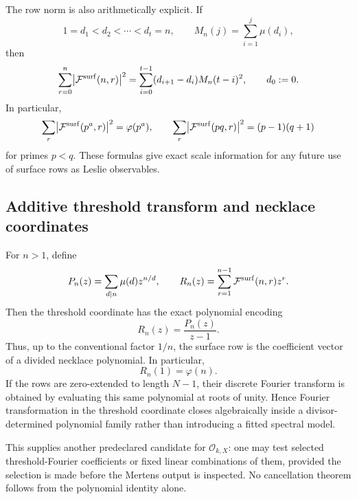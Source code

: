 \documentclass[11pt]{amsart}
\numberwithin{equation}{section}
\theoremstyle{plain}
\theoremstyle{definition}
\theoremstyle{remark}
\begin{document}
The row norm is also arithmetically explicit.  If
\[
1=d_1<d_2<\cdots<d_t=n,
\qquad
M_n(j)=\sum_{i=1}^j\mu(d_i),
\]
then
\begin{equation}
\sum_{r=0}^{n}\bigl|\mathcal F^{\rm surf}(n,r)\bigr|^2
=
\sum_{i=0}^{t-1}(d_{i+1}-d_i)M_n(t-i)^2,
\qquad d_0:=0.
\label{eq:v9_surface_row_energy}
\end{equation}
In particular,
\begin{equation}
\sum_r\bigl|\mathcal F^{\rm surf}(p^a,r)\bigr|^2=\varphi(p^a),
\qquad
\sum_r\bigl|\mathcal F^{\rm surf}(pq,r)\bigr|^2=(p-1)(q+1)
\label{eq:v9_surface_special_row_energy}
\end{equation}
for primes $p<q$.  These formulas give exact scale information for any future use of surface
rows as Leslie observables.

\subsection{Additive threshold transform and necklace coordinates}

For $n>1$, define
\begin{equation}
P_n(z)=\sum_{d\mid n}\mu(d)z^{n/d},
\qquad
R_n(z)=\sum_{r=1}^{n-1}\mathcal F^{\rm surf}(n,r)z^r.
\label{eq:v9_surface_row_polynomials}
\end{equation}
Then the threshold coordinate has the exact polynomial encoding
\begin{equation}
\boxed{R_n(z)=\frac{P_n(z)}{z-1}.}
\label{eq:v9_surface_divided_necklace}
\end{equation}
Thus, up to the conventional factor $1/n$, the surface row is the coefficient vector of a
divided necklace polynomial.  In particular,
\begin{equation}
R_n(1)=\varphi(n).
\label{eq:v9_surface_zero_mode_phi}
\end{equation}
If the rows are zero-extended to length $N-1$, their discrete Fourier transform is obtained by
evaluating this same polynomial at roots of unity.  Hence Fourier transformation in the
threshold coordinate closes algebraically inside a divisor-determined polynomial family rather
than introducing a fitted spectral model.

This supplies another predeclared candidate for $\mathcal O_{k,X}$: one may test selected
threshold-Fourier coefficients or fixed linear combinations of them, provided the selection is
made before the Mertens output is inspected.  No cancellation theorem follows from the
polynomial identity alone.
\end{document}
